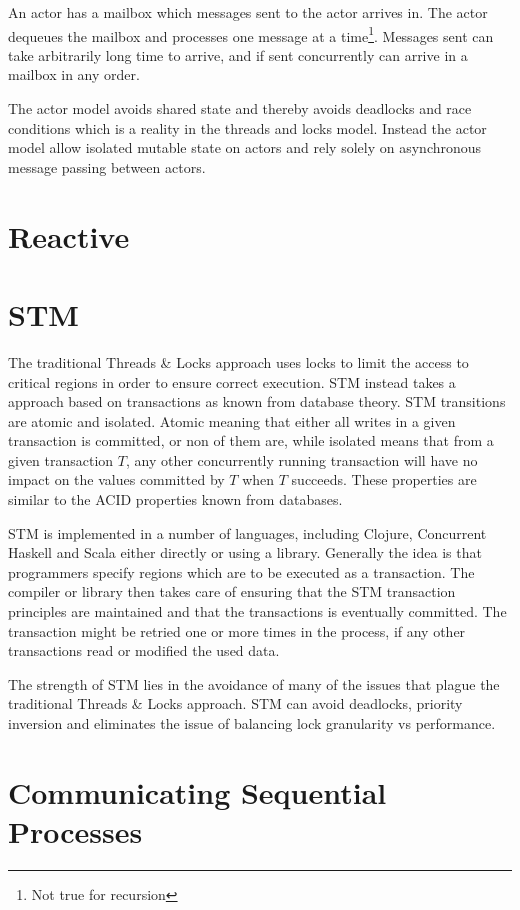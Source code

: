 An actor has a mailbox which messages sent to the actor arrives in. The actor dequeues the mailbox and processes one message at a time\footnote{Not true for recursion}. Messages sent can take arbitrarily long time to arrive, and if sent concurrently can arrive in a mailbox in any order\cite{hewitt2014actor}.

The actor model avoids shared state and thereby avoids deadlocks and race conditions which is a reality in the threads and locks model\citep[Chap. 32]{odersky2011programming}. Instead the actor model allow isolated mutable state on actors and rely solely on asynchronous message passing between actors.
\section{Reactive}
\section{\acl{STM}}
The traditional Threads \& Locks approach uses locks to limit the access to critical regions in order to ensure correct execution\cite[p. 1]{saha2006mcrt}. \ac{STM} instead takes a approach based on transactions as known from database theory\cite[p. 1]{shavit1997software}. \ac{STM} transitions are atomic and isolated. Atomic meaning that either all writes in a given transaction is committed, or non of them are, while isolated means that from a given transaction $T$, any other concurrently running transaction will have no impact on the values committed by $T$ when $T$ succeeds\cite[p. 102]{sevenModels}. These properties are similar to the ACID properties known from databases. 

\ac{STM} is implemented in a number of languages, including Clojure\cite[p. 101]{sevenModels}, Concurrent Haskell\cite{harris2005composable} and Scala\cite{goodman2011muts} either directly or using a library. Generally the idea is that programmers specify regions which are to be executed as a transaction. The compiler or library then takes care of ensuring that the \ac{STM} transaction principles are maintained and that the transactions is eventually committed\cite[p. 1]{saha2006mcrt}. The transaction might be retried one or more times in the process, if any other transactions read or modified the used data.

The strength of \ac{STM} lies in the avoidance of many of the issues that plague the traditional Threads \& Locks approach. \ac{STM} can avoid deadlocks, priority inversion and eliminates the issue of balancing lock granularity vs performance\cite[p. 1]{harris2005composable}.
\section{Communicating Sequential Processes}

\worksheetend
